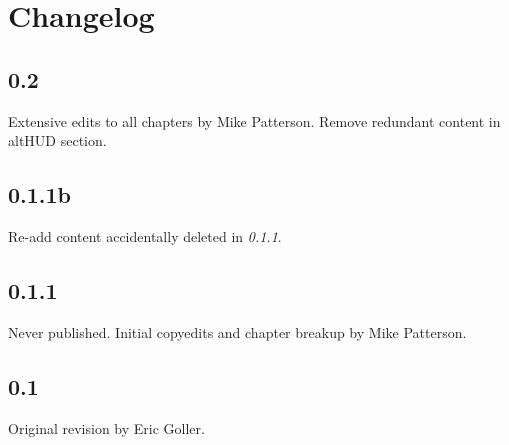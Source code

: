 \section{Changelog}

\subsection*{0.2}
Extensive edits to all chapters by Mike Patterson.  Remove redundant content in altHUD section.

\subsection*{0.1.1b}
Re-add content accidentally deleted in \emph{0.1.1}.

\subsection*{0.1.1}
Never published. Initial copyedits and chapter breakup by Mike Patterson.

\subsection*{0.1}
Original revision by Eric Goller.
